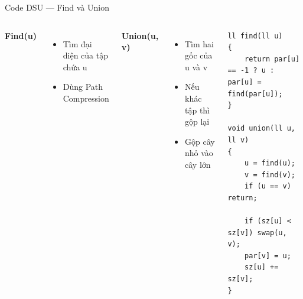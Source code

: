 \documentclass[aspectratio=169]{beamer}
\begin{document}
\begin{frame}[fragile]{Code DSU — Find và Union}

\begin{columns}

\textbf{Find(u)}
\begin{itemize}
    \item Tìm đại diện của tập chứa u
    \item Dùng Path Compression
\end{itemize}

\vspace{6pt}

\textbf{Union(u, v)}
\begin{itemize}
    \item Tìm hai gốc của u và v
    \item Nếu khác tập thì gộp lại
    \item Gộp cây nhỏ vào cây lớn
\end{itemize}

\scriptsize
\begin{verbatim}
ll find(ll u)
{
    return par[u] == -1 ? u : par[u] = find(par[u]);
}

void union(ll u, ll v)
{
    u = find(u);
    v = find(v);
    if (u == v) return;

    if (sz[u] < sz[v]) swap(u, v);
    par[v] = u;
    sz[u] += sz[v];
}
\end{verbatim}

\end{columns}

\end{frame}
\end{document}
